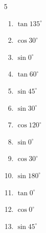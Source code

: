 \begin{multicols}{5}
\begin{enumerate}
  \item $\displaystyle \tan{135^\circ}$

        \phantom{$\displaystyle =-1$}

  \item $\displaystyle \cos{30^\circ}$


  \item $\displaystyle \sin{0^\circ}$

        \phantom{$\displaystyle =0$}

  \item $\displaystyle \tan{60^\circ}$


  \item $\displaystyle \sin{45^\circ}$


  \item $\displaystyle \sin{30^\circ}$


  \item $\displaystyle \cos{120^\circ}$


  \item $\displaystyle \sin{0^\circ}$

        \phantom{$\displaystyle =0$}

  \item $\displaystyle \cos{30^\circ}$


  \item $\displaystyle \sin{180^\circ}$

        \phantom{$\displaystyle =0$}

\columnbreak %

  \item $\displaystyle \tan{0^\circ}$

        \phantom{$\displaystyle =0$}

  \item $\displaystyle \cos{0^\circ}$

        \phantom{$\displaystyle =1$}

  \item $\displaystyle \sin{45^\circ}$


\end{enumerate}
\end{multicols}

